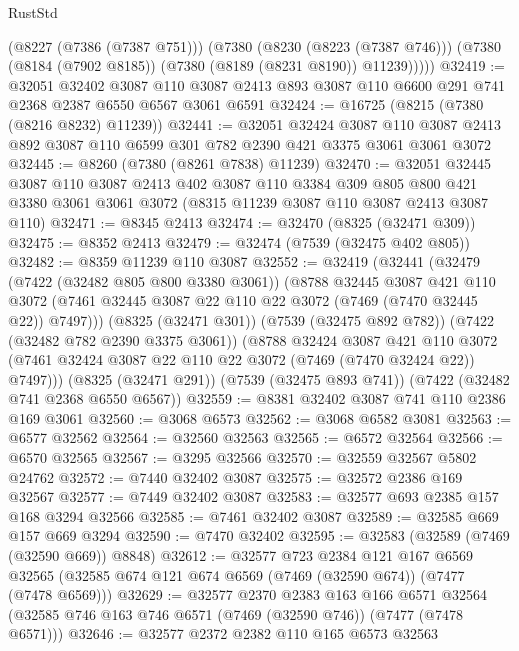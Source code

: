 \begin{lexlean}{RustStd}
\begin{coremodule}
        (@8227 (@7386 (@7387 @751)))
        (@7380
          (@8230 (@8223 (@7387 @746)))
          (@7380 (@8184 (@7902 @8185)) (@7380 (@8189 (@8231 @8190)) @11239)))))
@32419 := @32051
    @32402
    @3087
    @110
    @3087
    @2413
    @893
    @3087
    @110
    @6600
    @291
    @741
    @2368
    @2387
    @6550
    @6567
    @3061
    @6591
@32424 := @16725 (@8215 (@7380 (@8216 @8232) @11239))
@32441 := @32051
    @32424
    @3087
    @110
    @3087
    @2413
    @892
    @3087
    @110
    @6599
    @301
    @782
    @2390
    @421
    @3375
    @3061
    @3061
    @3072
@32445 := @8260 (@7380 (@8261 @7838) @11239)
@32470 := @32051
    @32445
    @3087
    @110
    @3087
    @2413
    @402
    @3087
    @110
    @3384
    @309
    @805
    @800
    @421
    @3380
    @3061
    @3061
    @3072
    (@8315 @11239 @3087 @110 @3087 @2413 @3087 @110)
@32471 := @8345 @2413
@32474 := @32470 (@8325 (@32471 @309))
@32475 := @8352 @2413
@32479 := @32474 (@7539 (@32475 @402 @805))
@32482 := @8359 @11239 @110 @3087
@32552 := @32419
    (@32441
      (@32479
        (@7422 (@32482 @805 @800 @3380 @3061))
        (@8788
          @32445
          @3087
          @421
          @110
          @3072
          (@7461 @32445 @3087 @22 @110 @22 @3072 (@7469 (@7470 @32445 @22)) @7497)))
      (@8325 (@32471 @301))
      (@7539 (@32475 @892 @782))
      (@7422 (@32482 @782 @2390 @3375 @3061))
      (@8788
        @32424
        @3087
        @421
        @110
        @3072
        (@7461 @32424 @3087 @22 @110 @22 @3072 (@7469 (@7470 @32424 @22)) @7497)))
    (@8325 (@32471 @291))
    (@7539 (@32475 @893 @741))
    (@7422 (@32482 @741 @2368 @6550 @6567))
@32559 := @8381 @32402 @3087 @741 @110 @2386 @169 @3061
@32560 := @3068 @6573
@32562 := @3068 @6582 @3081
@32563 := @6577 @32562
@32564 := @32560 @32563
@32565 := @6572 @32564
@32566 := @6570 @32565
@32567 := @3295 @32566
@32570 := @32559 @32567 @5802 @24762
@32572 := @7440 @32402 @3087
@32575 := @32572 @2386 @169 @32567
@32577 := @7449 @32402 @3087
@32583 := @32577 @693 @2385 @157 @168 @3294 @32566
@32585 := @7461 @32402 @3087
@32589 := @32585 @669 @157 @669 @3294
@32590 := @7470 @32402
@32595 := @32583 (@32589 (@7469 (@32590 @669)) @8848)
@32612 := @32577
    @723
    @2384
    @121
    @167
    @6569
    @32565
    (@32585 @674 @121 @674 @6569 (@7469 (@32590 @674)) (@7477 (@7478 @6569)))
@32629 := @32577
    @2370
    @2383
    @163
    @166
    @6571
    @32564
    (@32585 @746 @163 @746 @6571 (@7469 (@32590 @746)) (@7477 (@7478 @6571)))
@32646 := @32577
    @2372
    @2382
    @110
    @165
    @6573
    @32563

\end{coremodule}
\end{lexlean}
